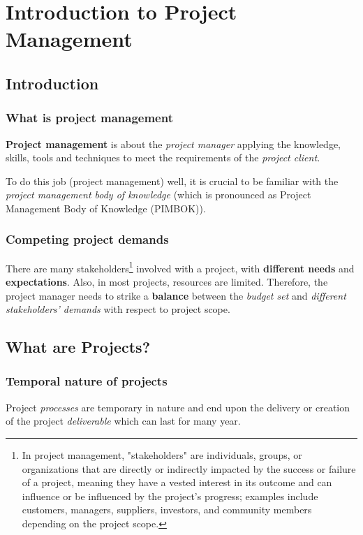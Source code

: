\documentclass[math,code]{amznotes}
\theoremstyle{remark}
\begin{document}
\tableofcontents

\chapter{Introduction to Project Management}
\section{Introduction}
\subsection{What is project management}
\textbf{Project management} is about the \textit{project manager} applying the knowledge, skills, tools and techniques to meet the requirements of the \textit{project client.}

To do this job (project management) well, it is crucial to be familiar with the \textit{project management body of knowledge} (which is pronounced as Project Management Body of Knowledge (PIMBOK)).

\subsection{Competing project demands}
There are many stakeholders\footnote{In project management, "stakeholders" are individuals, groups, or organizations that are directly or indirectly impacted by the success or failure of a project, meaning they have a vested interest in its outcome and can influence or be influenced by the project's progress; examples include customers, managers, suppliers, investors, and community members depending on the project scope.} involved with a project, with \textbf{different needs} and \textbf{expectations}. Also, in most projects, resources are limited. Therefore, the project manager needs to strike a \textbf{balance} between the \textit{budget set} and \textit{different stakeholders' demands} with respect to project scope.

\section{What are Projects?}
\subsection{Temporal nature of projects}
Project \textit{processes} are temporary in nature and end upon the delivery or creation of the project \textit{deliverable} which can last for many year.
\end{document}
